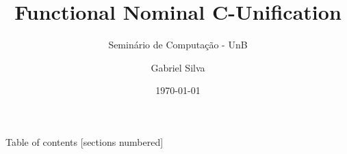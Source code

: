 \documentclass{beamer}
\title{Functional Nominal C-Unification}
\subtitle{Seminário de Computação - UnB}
\date{\today}
\author{Gabriel Silva}
\institute{Advisor: Mauricio Ayala-Rincón \\
Department of Mathematics - University of Brasília}
\begin{document}
\maketitle

\begin{frame}{Table of contents}
    [sections numbered]
    \tableofcontents
\end{frame}







\end{document}

